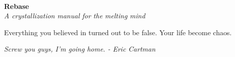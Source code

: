 \documentclass[a4paper,hidelinks]{article}
\begin{document}

~
\vspace{55px}

\begin{center}
{\Huge \textbf{
Rebase
}}\\
\vspace{10px}
\textit{
A crystallization manual for the melting mind
}
\end{center}

\vspace{70px}

\begin{center}
\end{center}

\thispagestyle{empty}

\newpage

\vspace*{\fill}
Everything you believed in turned out to be false. Your life become chaos.
\vspace*{\fill}

\restoregeometry
{}


\begin{center}
\textit{
Screw you guys, I'm going home.  - Eric Cartman
}
\end{center}
\end{document}
